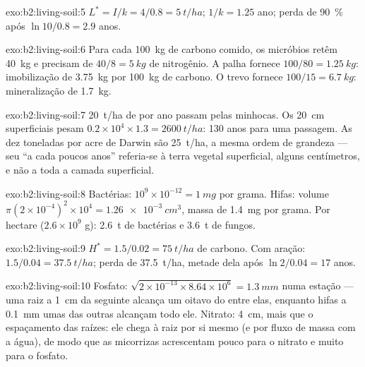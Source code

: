 \begin{solution}{exo:b2:living-soil:5}
$L^{*} = I/k = 4/0.8 = \qty{5}{t/ha}$;  $1/k = 1.25$
ano; perda de \qty{90}{\%} após $\ln 10/0.8 = 2.9$ anos.
\end{solution}

\begin{solution}{exo:b2:living-soil:6}
Para cada \qty{100}{kg} de carbono comido, os micróbios retêm
\qty{40}{kg} e precisam de $40/8 = \qty{5}{kg}$ de nitrogênio. A palha
fornece $100/80 =
\qty{1.25}{kg}$: imobilização de \qty{3.75}{kg} por \qty{100}{kg}
de carbono. O trevo fornece $100/15 = \qty{6.7}{kg}$: mineralização
de \qty{1.7}{kg}.
\end{solution}

\begin{solution}{exo:b2:living-soil:7}
\qty{20}{t/ha} de  por ano passam pelas minhocas. Os \qty{20}{cm}
superficiais pesam $0.2\times 10^{4}\times 1.3 = \qty{2600}{t/ha}$:
130 anos para uma passagem. As dez toneladas por acre de Darwin são
\qty{25}{t/ha}, a mesma ordem de grandeza --- seu ``a cada poucos anos''
referia-se à terra vegetal superficial, alguns centímetros, e não a toda
a camada superficial.
\end{solution}

\begin{solution}{exo:b2:living-soil:8}
Bactérias: $10^{9}\times 10^{-12} = \qty{1}{mg}$ por grama. Hifas:
volume $\pi(2\times 10^{-4})^{2}\times 10^{4} = \qty{1.26e-3}{cm^3}$,
massa de \qty{1.4}{mg} por grama. Por hectare ($2.6\times 10^{9}$ g):
\qty{2.6}{t} de bactérias e \qty{3.6}{t} de fungos.
\end{solution}

\begin{solution}{exo:b2:living-soil:9}
$H^{*} = 1.5/0.02 = \qty{75}{t/ha}$ de carbono. Com aração: $1.5/0.04
= \qty{37.5}{t/ha}$; perda de \qty{37.5}{t/ha}, metade dela após
$\ln 2/0.04 = 17$ anos.
\end{solution}

\begin{solution}{exo:b2:living-soil:10}
Fosfato: $\sqrt{2\times 10^{-13}\times 8.64\times 10^{6}} =
\qty{1.3}{mm}$ numa estação --- uma raiz a \qty{1}{cm} da seguinte
alcança um oitavo do  entre elas, enquanto hifas a
\qty{0.1}{mm} umas das outras alcançam todo ele. Nitrato: \qty{4}{cm},
mais que o espaçamento das raízes: ele chega à raiz por si mesmo (e por
fluxo de massa com a água), de modo que as micorrizas acrescentam pouco
para o nitrato e muito para o fosfato.
\end{solution}

